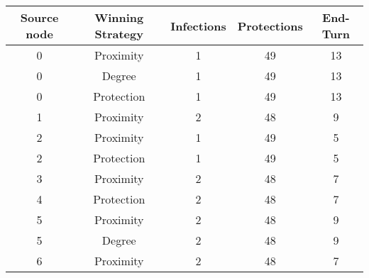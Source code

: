 \documentclass[results.tex]{subfiles}
\begin{document}
    \begin{center}
        \begin{tabular}{| c || c | c | c | c |}
            \hline
            {\bfseries Source node} & {\bfseries Winning Strategy} & {\bfseries Infections} & {\bfseries Protections}
            & {\bfseries End-Turn}
            \\  %
            \hline\hline
            0                       & Proximity                    & 1                      & 49                      & 13                   \\
            \hline
            0                       & Degree                       & 1                      & 49                      & 13                   \\
            \hline
            0                       & Protection                   & 1                      & 49                      & 13                   \\
            \hline
            1                       & Proximity                    & 2                      & 48                      & 9                    \\
            \hline
            2                       & Proximity                    & 1                      & 49                      & 5                    \\
            \hline
            2                       & Protection                   & 1                      & 49                      & 5                    \\
            \hline
            3                       & Proximity                    & 2                      & 48                      & 7                    \\
            \hline
            4                       & Protection                   & 2                      & 48                      & 7                    \\
            \hline
            5                       & Proximity                    & 2                      & 48                      & 9                    \\
            \hline
            5                       & Degree                       & 2                      & 48                      & 9                    \\
            \hline
            6                       & Proximity                    & 2                      & 48                      & 7                    \\

\end{tabular}
\end{center}
\end{document}
